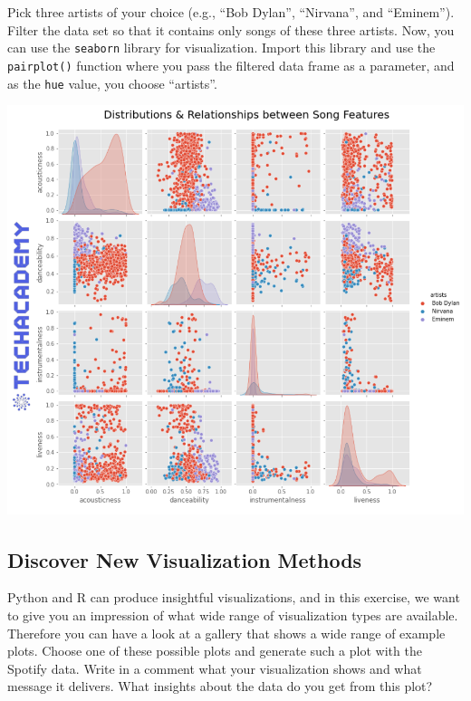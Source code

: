 \documentclass[
  11pt,
]{book}
\newenvironment{tipsp}[1]
  {
  \begin{itemize}
  \footnotesize
  \renewcommand{\labelitemi}{
    \raisebox{-.7\height}[0pt][0pt]{
      {\setkeys{Gin}{width=3em,keepaspectratio}
        \texttt{[image: images/\#1.png]}}
    }
  }
  \setlength{\fboxsep}{1em}
  \begin{pbox}
  \item
  }
  {
  \end{pbox}
  \end{itemize}
  }
\begin{document}
\begin{tipsp}p

Pick three artists of your choice (e.g., ``Bob Dylan'', ``Nirvana'', and ``Eminem''). Filter the data set so that it contains only songs of these three artists.
Now, you can use the \texttt{seaborn} library for visualization. Import this library and use the \texttt{pairplot()} function where you pass the filtered data frame as a parameter, and as the \texttt{hue} value, you choose ``artists''.

\end{tipsp}

\begin{center}\includegraphics[width=1\linewidth]{splots/feature_comparison} \end{center}

\hypertarget{discover-new-visualization-methods}{%
\subsection{Discover New Visualization Methods}\label{discover-new-visualization-methods}}

Python and R can produce insightful visualizations, and in this exercise, we want to give you an impression of what wide range of visualization types are available. Therefore you can have a look at a gallery that shows a wide range of example plots. Choose one of these possible plots and generate such a plot with the Spotify data.
Write in a comment what your visualization shows and what message it delivers. What insights about the data do you get from this plot?
\end{document}
